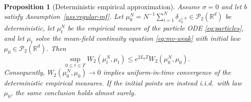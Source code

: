 \documentclass[11pt]{amsart}
\numberwithin{equation}{section}
\theoremstyle{plain}
\newtheorem{proposition}[theorem]{Proposition}
\newcommand{\R}{\mathbb{R}}
\newcommand{\cP}{\mathcal{P}}
\begin{document}
\begin{proposition}[Deterministic empirical approximation]
\label{prop:deterministic-empirical-convergence}
 Assume $\sigma=0$ and let $b$ satisfy Assumption~\ref{ass:regular-mf}.  Let
$\mu_0^N=N^{-1}\sum_{i=1}^N\delta_{x_0^{i,N}}\in\cP_2(\R^d)$ be deterministic,
let $\mu_t^N$ be the empirical measure of the particle ODE
\eqref{eq:particles}, and let $\mu_t$ solve the mean-field continuity equation \eqref{eq:mv-weak} 
with initial law $\mu_0\in\cP_2(\R^d)$.  Then
\begin{equation}\label{eq:deterministic-empirical-stability}
 \sup_{0\leq t\leq T}W_2(\mu_t^N,\mu_t)
 \leq e^{2L_bT}W_2(\mu_0^N,\mu_0).
\end{equation}
Consequently, $W_2(\mu_0^N,\mu_0)\to0$ implies uniform-in-time convergence of
the deterministic empirical measures.  If the initial points are instead
i.i.d.\ with law $\mu_0$, the same conclusion holds almost surely.
\end{proposition}
\end{document}
